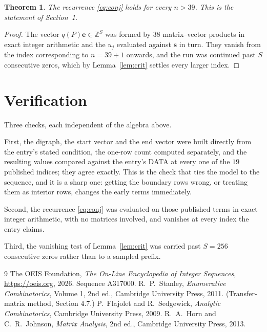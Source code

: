 \documentclass[11pt,a4paper]{article}
\theoremstyle{plain}
\newtheorem{theorem}{Theorem}
\theoremstyle{definition}
\begin{document}
\begin{theorem}
The recurrence \eqref{eq:conj} holds for every $n>39$. This is the statement of
Section~1.
\end{theorem}

\begin{proof}
The vector $q(P)\mathbf{e}\in\mathbb{Z}^{S}$ was formed by $38$ matrix--vector
products in exact integer arithmetic and the $u_j$ evaluated against $\mathbf{s}$ in turn.
They vanish from the index corresponding to $n=39+1$ onwards, and the run was continued
past $S$ consecutive zeros, which by Lemma~\ref{lem:crit} settles every larger index.
\end{proof}

\section{Verification}

Three checks, each independent of the algebra above.

First, the digraph, the start vector and the end vector were built directly from the
entry's stated condition, the one-row count computed separately, and the resulting values
compared against the entry's DATA at every one of the $19$ published indices; they
agree exactly. This is the check that ties the model to the sequence, and it is a sharp one:
getting the boundary rows wrong, or treating them as interior rows, changes the early terms
immediately.

Second, the recurrence \eqref{eq:conj} was evaluated on those published terms in exact
integer arithmetic, with no matrices involved, and vanishes at every index the entry claims.

Third, the vanishing test of Lemma~\ref{lem:crit} was carried past $S=256$ consecutive
zeros rather than to a sampled prefix.

\begin{thebibliography}{9}
 The OEIS Foundation, \emph{The On-Line Encyclopedia of Integer
Sequences}, \url{https://oeis.org}, 2026. Sequence A317000.
 R.~P.~Stanley, \emph{Enumerative Combinatorics}, Volume 1, 2nd ed.,
Cambridge University Press, 2011. (Transfer-matrix method, Section 4.7.)
 P.~Flajolet and R.~Sedgewick, \emph{Analytic Combinatorics}, Cambridge
University Press, 2009.
 R.~A.~Horn and C.~R.~Johnson, \emph{Matrix Analysis}, 2nd ed., Cambridge
University Press, 2013.
\end{thebibliography}
\end{document}
